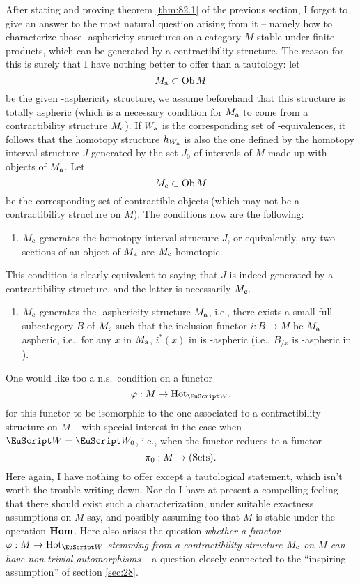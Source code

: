 \label{sec:83}%
After stating and proving theorem \ref{thm:82.1} of the previous
section, I forgot to give an answer to the most natural question
arising from it -- namely how to characterize those \scrW-asphericity
structures on a category $M$ stable under finite products, which can
be generated by a contractibility structure. The reason for this is
surely that I have nothing better to offer than a tautology: let
\[M_{\mathrm{a}} \subset \operatorname{Ob} M\]
be the given \scrW-asphericity structure, we assume beforehand that
this structure is totally aspheric (which is a necessary condition for
$M_{\mathrm{a}}$ to come from a contractibility structure $M_{\mathrm{c}}$). If
$W_{\mathrm{a}}$ is the corresponding set of \scrW-equivalences, it follows
that the homotopy structure $h_{W_{\mathrm{a}}}$ is also the one defined by
the homotopy interval structure $J$ generated by the set $J_0$ of
intervals of $M$ made up with objects of $M_{\mathrm{a}}$. Let
\[M_{\mathrm{c}} \subset \operatorname{Ob} M\]
be the corresponding set of contractible objects (which may not be a
contractibility structure on $M$). The conditions now are the
following:
\begin{enumerate}[label=\alph*)]
\item\label{it:83.a}
  $M_{\mathrm{c}}$ generates the homotopy interval structure $J$, or
  equivalently, any two sections of an object of $M_{\mathrm{a}}$ are $M_{\mathrm{c}}$-homotopic.
\end{enumerate}
This condition is clearly equivalent to saying that $J$ is indeed
generated by a contractibility structure, and the latter is
necessarily $M_{\mathrm{c}}$.
\begin{enumerate}[label=\alph*),start=2]
\item\label{it:83.b}
  $M_{\mathrm{c}}$ generates the \scrW-asphericity structure $M_{\mathrm{a}}$, i.e.,
  there exists a small full subcategory $B$ of $M_{\mathrm{c}}$ such that the
  inclusion functor $i:B\to M$ be $M_{\mathrm{a}}$-\scrW-aspheric, i.e., for
  any $x$ in $M_{\mathrm{a}}$, $i^*(x)$ in \Bhat{} is \scrW-aspheric (i.e.,
  $B_{/x}$ is \scrW-aspheric in \Cat).
\end{enumerate}

One would like too a n.s.\ condition on a functor
\[\varphi:M\to\HotOf_\scrW,\]
for this functor to be isomorphic to the one associated to a
contractibility structure on $M$ -- with special interest in the case
when $\scrW=\scrWz$, i.e., when the functor reduces to a functor
\[{\pi_0}:M\to{\ensuremath{(\mathrm{Sets})}}.\]
Here again, I have nothing to offer except a tautological statement,
which isn't worth the trouble writing down. Nor do I have at present a
compelling feeling that there should exist such a characterization,
under suitable exactness assumptions on $M$ say, and possibly assuming
too that $M$ is stable under the operation $\operatorname{\mathbf{Hom}}$. Here also arises
the question \emph{whether a functor $\varphi:M\to\HotOf_\scrW$
  stemming from a contractibility structure $M_{\mathrm{c}}$ on $M$ can have
  non-trivial automorphisms} -- a question closely connected to the
``inspiring assumption'' of section \ref{sec:28}.

